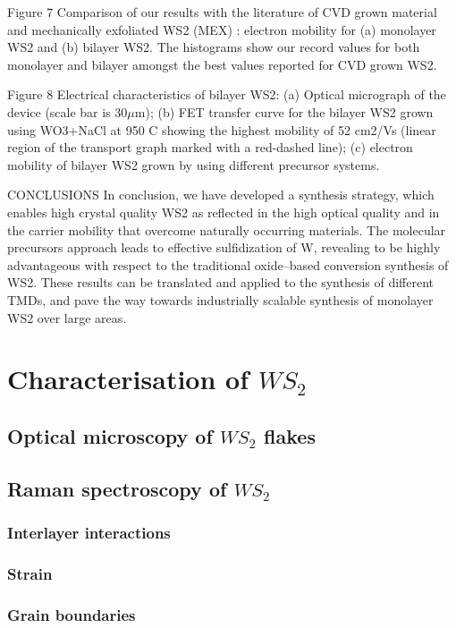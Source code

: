 \documentclass[12pt]{article}
\begin{document}
Figure 7 Comparison of our results with the literature of CVD grown material and mechanically exfoliated WS2 (MEX) : electron mobility for (a) monolayer WS2 and (b) bilayer WS2. The histograms show our record values for both monolayer and bilayer amongst the best values reported for CVD grown WS2.
 
Figure 8 Electrical characteristics of bilayer WS2: (a) Optical micrograph of the device (scale bar is 30$\mu$m); (b) FET transfer curve for the bilayer WS2 grown using WO3+NaCl at 950 {\degree}C showing the highest mobility of 52 cm2/Vs (linear region of the transport graph marked with a red-dashed line); (c) electron mobility of bilayer WS2 grown by using different precursor systems.

CONCLUSIONS
In conclusion, we have developed a synthesis strategy, which enables high crystal quality WS2 as reflected in the high optical quality and in the carrier mobility that overcome naturally occurring materials. The molecular precursors approach leads to effective sulfidization of W, revealing to be highly advantageous with respect to the traditional oxide–based conversion synthesis of WS2. These results can be translated and applied to the synthesis of different TMDs, and pave the way towards industrially scalable synthesis of monolayer WS2 over large areas. 


\section{Characterisation of $WS_2$}
	\subsection{Optical microscopy of $WS_2$ flakes}
	\subsection{Raman spectroscopy of $WS_2$}
		\subsubsection{Interlayer interactions}
		\subsubsection{Strain}
		\subsubsection{Grain boundaries}
\end{document}
